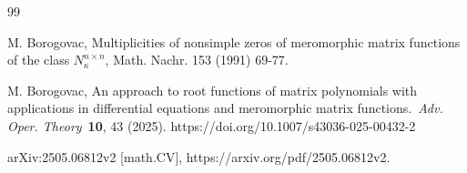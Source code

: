 \documentclass[11pt, reqno]{amsart}
\theoremstyle{plain}
\theoremstyle{remark}
\numberwithin{equation}{section}
\begin{document}
\begin{thebibliography}{99}







 M. Borogovac, Multiplicities of nonsimple zeros of meromorphic matrix functions of the class $N_{\kappa}^{n\times n}$, Math. Nachr. 153 (1991) 69-77.



 M. Borogovac, An approach to root functions of matrix polynomials with applications in differential equations and meromorphic matrix functions.~\textit{Adv. Oper. Theory}~\textbf{10}, 43 (2025). https://doi.org/10.1007/s43036-025-00432-2

arXiv:2505.06812v2 [math.CV], https://arxiv.org/pdf/2505.06812v2.


\end{thebibliography}
\end{document}
